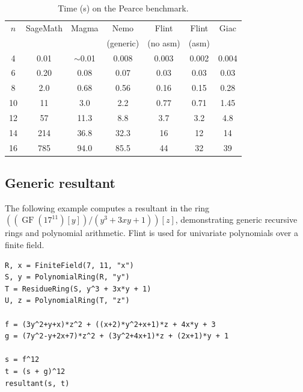 \documentclass{sig-alternate-05-2015}
\begin{document}
\begin{table}
\center
\caption{Time (s) on the Pearce benchmark.}
\begin{small}
\setlength{\tabcolsep}{2.5pt}
\renewcommand{\arraystretch}{1.15}
\begin{tabular}{c c c c c c c} \hline
$n$ & SageMath & Magma & Nemo & Flint & Flint & Giac \\ 
    &          &       & (generic) & (no asm) & (asm) & \\ \hline
     4  &   0.01 & $\sim$0.01  &   0.008          & 0.003         &   0.002             &                     0.004 \\
     6  &   0.20  &   0.08   &     0.07        &     0.03       &       0.03         &                           0.03 \\
     8  &   2.0  &     0.68   &     0.56       &      0.16      &        0.15        &                            0.28 \\
    10  &   11   &     3.0    &       2.2      &       0.77     &         0.71       &                             1.45 \\
    12  &   57   &    11.3    &      8.8       &        3.7     &           3.2      &                                4.8 \\
    14  &  214   &   36.8     &   32.3         &       16       &         12         &                               14 \\
    16  &  785   &   94.0     &   85.5         &       44       &         32         &                               39 \\
\end{tabular}
\label{tab:pearce}
\end{small}
\end{table}

\subsection{Generic resultant}

The following example computes a resultant
in the ring $((\operatorname{GF}(17^{11})[y])/(y^3 + 3xy + 1))[z]$,
demonstrating generic recursive rings and polynomial
arithmetic. Flint is used for univariate polynomials over a finite field.

\begin{verbatim}
R, x = FiniteField(7, 11, "x")
S, y = PolynomialRing(R, "y")
T = ResidueRing(S, y^3 + 3x*y + 1)
U, z = PolynomialRing(T, "z")

f = (3y^2+y+x)*z^2 + ((x+2)*y^2+x+1)*z + 4x*y + 3
g = (7y^2-y+2x+7)*z^2 + (3y^2+4x+1)*z + (2x+1)*y + 1

s = f^12
t = (s + g)^12
resultant(s, t)
\end{verbatim}
\end{document}
